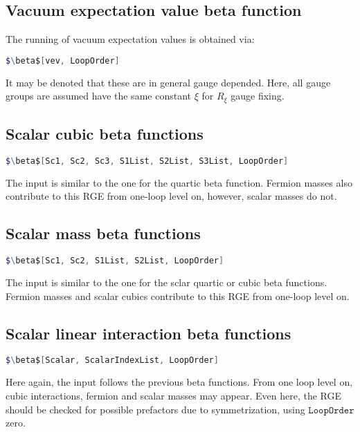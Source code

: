 \documentclass{scrartcl}
\begin{document}
\subsection{Vacuum expectation value beta function}
The running of vacuum expectation values is obtained via:
\begin{lstlisting}[language=mathematica,mathescape,columns=flexible,backgroundcolor=\color{light-gray}]
$\beta$[vev, LoopOrder]
\end{lstlisting}
It may be denoted that these are in general gauge depended. Here, all gauge groups are assumed have the same constant $\xi$ for $R_{\xi}$ gauge fixing.\FloatBarrier
\subsection{Scalar cubic beta functions}
\begin{lstlisting}[language=mathematica,mathescape,columns=flexible,backgroundcolor=\color{light-gray}]
$\beta$[Sc1, Sc2, Sc3, S1List, S2List, S3List, LoopOrder]
\end{lstlisting}
The input is similar to the one for the quartic beta function. Fermion masses also contribute to this RGE from one-loop level on, however, scalar masses do not.\\ \FloatBarrier
\subsection{Scalar mass beta functions}
\begin{lstlisting}[language=mathematica,mathescape,columns=flexible,backgroundcolor=\color{light-gray}]
$\beta$[Sc1, Sc2, S1List, S2List, LoopOrder]
\end{lstlisting}
The input is similar to the one for the sclar quartic or cubic beta functions. Fermion masses and scalar cubics contribute to this RGE from one-loop level on.\\ \FloatBarrier
\subsection{Scalar linear interaction beta functions}
\begin{lstlisting}[language=mathematica,mathescape,columns=flexible,backgroundcolor=\color{light-gray}]
$\beta$[Scalar, ScalarIndexList, LoopOrder]
\end{lstlisting}
Here again, the input follows the previous beta functions. From one loop level on, cubic interactions, fermion and scalar masses may appear. Even here, the RGE should be checked for possible prefactors due to symmetrization, using $\mathtt{LoopOrder}$ zero.  \\ \FloatBarrier
\end{document}
